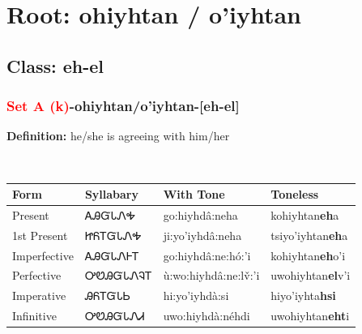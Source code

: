 \needspace{4in}
\section*{Root: ohiyhtan / o'iyhtan}
\nopagebreak
{}
\needspace{3in}
\subsection*{Class: eh-el}
\nopagebreak
\needspace{2in}
\subsubsection*{\textcolor{Red}{Set A (k)}{-}\textbf{ohiyhtan/o'iyhtan}{-}[eh-el]}
\nopagebreak
\textbf{Definition: } he/she is agreeing with him/her
\\[0.5em]
\begin{tabularx}{\textwidth}{l X X X}%
\toprule%
\textbf{Form}&\textbf{Syllabary}&\textbf{With Tone}&\textbf{Toneless}\\%
\midrule%
Present&ᎪᎯᏳᏓᏁᎭ&go:hiyhdâ:neha&kohiyhtan\textbf{eh}a\\%
1st Present&ᏥᏲᎢᏳᏓᏁᎭ&ji:yo’iyhdâ:neha&tsiyo'iyhtan\textbf{eh}a\\%
Imperfective&ᎪᎯᏳᏓᏁᎰᎢ&go:hiyhdâ:ne:hó:’i&kohiyhtan\textbf{eh}o'i\\%
Perfective&ᎤᏬᎯᏳᏓᏁᎸᎢ&ù:wo:hiyhdâ:ne:lv̌:’i&uwohiyhtan\textbf{el}v'i\\%
Imperative&ᎯᏲᎢᏳᏓᏏ&hi:yo’iyhdà:si&hiyo'iyhta\textbf{hsi}\\%
Infinitive&ᎤᏬᎯᏳᏓᏁᏗ&uwo:hiyhdà:néhdi&uwohiyhtan\textbf{eht}i\\%
\bottomrule%
\end{tabularx}
\\[1em]